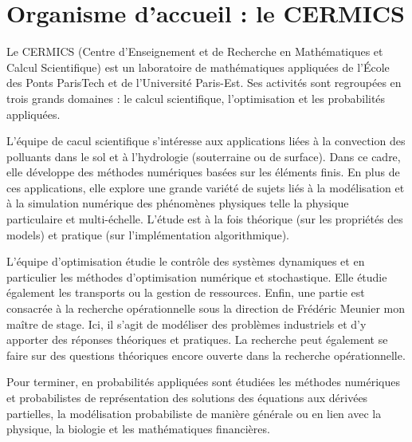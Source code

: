 \chapter*{Organisme d'accueil : le CERMICS}

Le CERMICS (Centre d'Enseignement et de Recherche en Mathématiques et Calcul Scientifique) est un laboratoire de mathématiques appliquées de l'\'Ecole des Ponts ParisTech et de l'Université Paris-Est. Ses activités sont regroupées en trois grands domaines : le calcul scientifique, l'optimisation et les probabilités appliquées.

L'équipe de cacul scientifique s'intéresse aux applications liées à la convection des polluants dans le sol et à l'hydrologie (souterraine ou de surface). Dans ce cadre, elle développe des méthodes numériques basées sur les éléments finis. En plus de ces applications, elle explore une grande variété de sujets liés à la modélisation et à la simulation numérique des phénomènes physiques telle la physique particulaire et multi-échelle. L'étude est à la fois théorique (sur les propriétés des models) et pratique (sur l'implémentation algorithmique).

L'équipe d'optimisation étudie le contrôle des systèmes dynamiques et en particulier les méthodes d'optimisation numérique et stochastique. Elle étudie également les transports ou la gestion de ressources. Enfin, une partie est consacrée à la recherche opérationnelle sous la direction de Frédéric Meunier mon maître de stage. Ici, il s'agit de modéliser des problèmes industriels et d'y apporter des réponses théoriques et pratiques. La recherche peut également se faire sur des questions théoriques encore ouverte dans la recherche opérationnelle.

Pour terminer, en probabilités appliquées sont étudiées les méthodes numériques et probabilistes de représentation des solutions des équations aux dérivées partielles, la modélisation probabiliste de manière générale ou en lien avec la physique, la biologie et les mathématiques financières.
